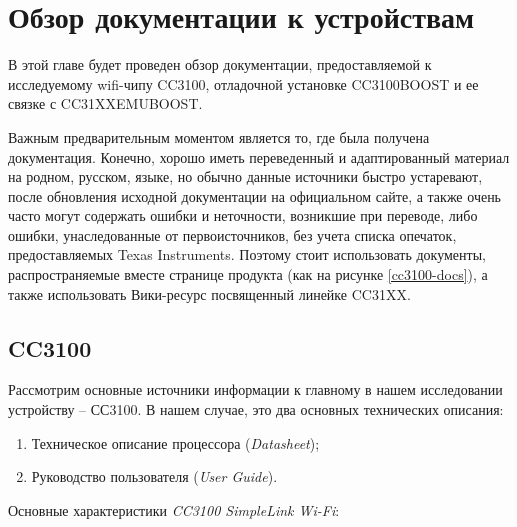 \chapter{Обзор документации к устройствам}
\label{cha:analysis}

В этой главе будет проведен обзор документации, предоставляемой
к исследуемому wifi-чипу CC3100, отладочной установке CC3100BOOST
и ее связке с CC31XXEMUBOOST.

Важным предварительным моментом является то, где была получена
документация. Конечно, хорошо иметь переведенный и адаптированный
материал на родном, русском, языке, но обычно данные источники
быстро устаревают, после обновления исходной документации на
официальном сайте, а также очень часто могут содержать
ошибки и неточности, возникшие при переводе, либо ошибки,
унаследованные от первоисточников, без учета списка опечаток,
предоставляемых Texas Instruments. Поэтому стоит использовать
документы, распространяемые вместе странице продукта (как на рисунке \ref{cc3100-docs}),
а также использовать Вики-ресурс посвященный линейке CC31XX\cite{cc3100wiki}.

\vspace{2cm}
\vspace{2cm}
\clearpage

\section{CC3100}

Рассмотрим основные источники информации к главному в нашем
исследовании устройству -- СС3100. В нашем случае,
это два основных технических описания:

\begin{enumerate}
    \item Техническое описание процессора (\textit{Datasheet})\cite{cc3100datasheet};
    \item Руководство пользователя (\textit{User Guide})\cite{cc3100userguide}.
\end{enumerate}

Основные характеристики \textit{CC3100 SimpleLink Wi-Fi}:

